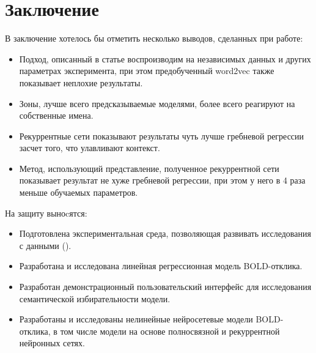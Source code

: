 \documentclass[pdftex,ptm,12pt,a4paper]{report}
\theoremstyle{definition}
\begin{document}
\chapter{Заключение}

В заключение хотелось бы отметить несколько выводов, сделанных при работе:

\begin{itemize}
\item Подход, описанный в статье \cite{hanke2014high} воспроизводим на независимых данных и других параметрах эксперимента, при этом предобученный word2vec также показывает неплохие результаты.

\item Зоны, лучше всего предсказываемые моделями, более всего реагируют на собственные имена.

\item Рекуррентные сети показывают результаты чуть лучше гребневой регрессии засчет того, что улавливают контекст.

\item Метод, использующий представление, полученное рекуррентной сети показывает результат не хуже гребневой регрессии, при этом у него в 4 раза меньше обучаемых параметров.
\end{itemize}

На защиту выноcятся:
\begin{itemize}
\item Подготовлена экспериментальная среда, позволяющая развивать исследования с данными (\cite{huth2016natural}).
\item Разработана и исследована линейная регрессионная модель BOLD-отклика.
\item Разработан демонстрационный пользовательский интерфейс для исследования семантической избирательности модели.
\item Разработаны и исследованы нелинейные нейросетевые модели BOLD-отклика, в том числе модели на основе полносвязной и рекуррентной нейронных сетях.
\end{itemize}



\end{document}
